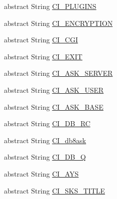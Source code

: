 \begin{DoxyCompactItemize}
\item 
abstract String \mbox{\hyperlink{class_n_t_k_1_1_other_1_1_language_a6ee88aef17a67f97e8bfa2815a2d85f2}{C\+I\+\_\+\+P\+L\+U\+G\+I\+NS}}
\item 
abstract String \mbox{\hyperlink{class_n_t_k_1_1_other_1_1_language_aeb473f380b0245da8624a6e125ce6907}{C\+I\+\_\+\+E\+N\+C\+R\+Y\+P\+T\+I\+ON}}
\item 
abstract String \mbox{\hyperlink{class_n_t_k_1_1_other_1_1_language_a1bfa1bb3fe026c0c07d01ad183506b11}{C\+I\+\_\+\+C\+GI}}
\item 
abstract String \mbox{\hyperlink{class_n_t_k_1_1_other_1_1_language_a84455dd037c34ad92d4ca148b052891e}{C\+I\+\_\+\+E\+X\+IT}}
\item 
abstract String \mbox{\hyperlink{class_n_t_k_1_1_other_1_1_language_af3b2aefc809eaee53abeef8440abf106}{C\+I\+\_\+\+A\+S\+K\+\_\+\+S\+E\+R\+V\+ER}}
\item 
abstract String \mbox{\hyperlink{class_n_t_k_1_1_other_1_1_language_a149b41f14494b0d14508b0302a4d8932}{C\+I\+\_\+\+A\+S\+K\+\_\+\+U\+S\+ER}}
\item 
abstract String \mbox{\hyperlink{class_n_t_k_1_1_other_1_1_language_a3f424fb74c0f9a53fa224a96fb43c905}{C\+I\+\_\+\+A\+S\+K\+\_\+\+B\+A\+SE}}
\item 
abstract String \mbox{\hyperlink{class_n_t_k_1_1_other_1_1_language_a249b88ece740f5a31316cd14487a77cb}{C\+I\+\_\+\+D\+B\+\_\+\+RC}}
\item 
abstract String \mbox{\hyperlink{class_n_t_k_1_1_other_1_1_language_af10de6aeb5b4d9ff49632c1e16bdc64a}{C\+I\+\_\+db8ask}}
\item 
abstract String \mbox{\hyperlink{class_n_t_k_1_1_other_1_1_language_a0fdba1ff347ce3eea06c0a1102201916}{C\+I\+\_\+\+D\+B\+\_\+Q}}
\item 
abstract String \mbox{\hyperlink{class_n_t_k_1_1_other_1_1_language_a00ab39a2f0b3b6829c08a957b1f54437}{C\+I\+\_\+\+A\+YS}}
\item 
abstract String \mbox{\hyperlink{class_n_t_k_1_1_other_1_1_language_a51289d4f0552e8ae2b43ccefa7ee3fa4}{C\+I\+\_\+\+S\+K\+S\+\_\+\+T\+I\+T\+LE}}
\end{DoxyCompactItemize}


